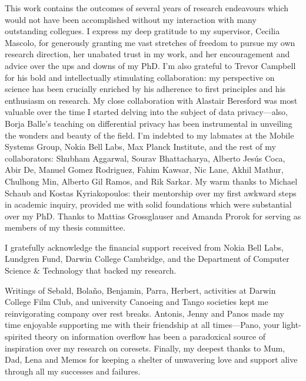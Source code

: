 
\begin{acknowledgements}
This work contains the outcomes of several years of research endeavours which would not have been accomplished without my interaction with many outstanding collegues. I express my deep gratitude to my supervisor, Cecilia Mascolo, for generously granting me vast stretches of freedom to pursue my own research direction, her unabated trust in my work, and her encouragement and advice over the ups and downs of my PhD. I'm also grateful to Trevor Campbell for his bold and intellectually stimulating collaboration: my perspective on science has been crucially enriched by his adherence to first principles and his enthusiasm on research. My close collaboration with Alastair Beresford was most valuable over the time I started delving into the subject of data privacy---also, Borja Balle's teaching on differential privacy has been instrumental in unveiling the wonders and beauty of the field. 
I'm indebted to my labmates at the Mobile Systems Group, Nokia Bell Labs, Max Planck Institute, and the rest of my collaborators:
Shubham Aggarwal, Sourav Bhattacharya, Alberto Jes\'{u}s Coca, Abir De, Manuel Gomez Rodriguez, Fahim Kawsar, Nic Lane,  Akhil Mathur, Chulhong Min, Alberto Gil Ramos, and Rik Sarkar. My warm thanks to Michael Schaub and Kostas Kyriakopoulos: their mentorship over my first awkward steps in academic inquiry, provided me with solid foundations which were substantial over my PhD. Thanks to Mattias Grossglauser and Amanda Prorok for serving as members of my thesis committee.

I gratefully acknowledge the financial support received from Nokia Bell Labs, Lundgren Fund, Darwin College Cambridge, and the Department of Computer Science \& Technology that backed my research. 

Writings of Sebald, Bola{\~{n}}o, Benjamin, Parra, Herbert, activities at Darwin College Film Club, and university Canoeing and Tango societies kept me reinvigorating company over rest breaks. Antonis, Jenny and Panos made my time enjoyable supporting me with their friendship at all times---Pano, your light-spirited theory on information overflow has been a paradoxical source of inspiration over my research on coresets. Finally, my deepest thanks to Mum, Dad, Lena and Memos for keeping a shelter of unwavering love and support alive through all my successes and failures.
\end{acknowledgements}
